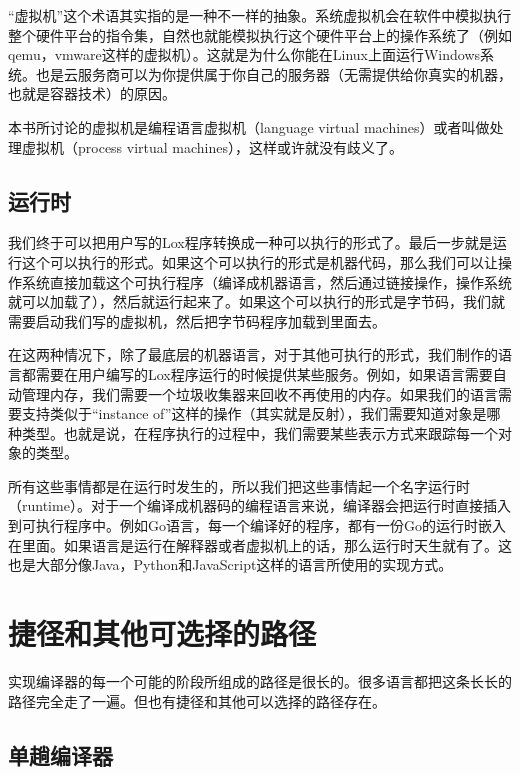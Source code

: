 \documentclass[cn,10pt,math=newtx,citestyle=gb7714-2015,bibstyle=gb7714-2015]{elegantbook}
\begin{document}
\begin{tcolorbox}
“虚拟机”这个术语其实指的是一种不一样的抽象。系统虚拟机会在软件中模拟执行整个硬件平台的指令集，自然也就能模拟执行这个硬件平台上的操作系统了（例如qemu，vmware这样的虚拟机）。这就是为什么你能在Linux上面运行Windows系统。也是云服务商可以为你提供属于你自己的服务器（无需提供给你真实的机器，也就是容器技术）的原因。

本书所讨论的虚拟机是编程语言虚拟机（language virtual machines）或者叫做处理虚拟机（process virtual machines），这样或许就没有歧义了。
\end{tcolorbox}

\subsection{运行时}

我们终于可以把用户写的Lox程序转换成一种可以执行的形式了。最后一步就是运行这个可以执行的形式。如果这个可以执行的形式是机器代码，那么我们可以让操作系统直接加载这个可执行程序（编译成机器语言，然后通过链接操作，操作系统就可以加载了），然后就运行起来了。如果这个可以执行的形式是字节码，我们就需要启动我们写的虚拟机，然后把字节码程序加载到里面去。

在这两种情况下，除了最底层的机器语言，对于其他可执行的形式，我们制作的语言都需要在用户编写的Lox程序运行的时候提供某些服务。例如，如果语言需要自动管理内存，我们需要一个垃圾收集器来回收不再使用的内存。如果我们的语言需要支持类似于“instance of”这样的操作（其实就是反射），我们需要知道对象是哪种类型。也就是说，在程序执行的过程中，我们需要某些表示方式来跟踪每一个对象的类型。

所有这些事情都是在运行时发生的，所以我们把这些事情起一个名字运行时（runtime）。对于一个编译成机器码的编程语言来说，编译器会把运行时直接插入到可执行程序中。例如Go语言，每一个编译好的程序，都有一份Go的运行时嵌入在里面。如果语言是运行在解释器或者虚拟机上的话，那么运行时天生就有了。这也是大部分像Java，Python和JavaScript这样的语言所使用的实现方式。

\section{捷径和其他可选择的路径}

实现编译器的每一个可能的阶段所组成的路径是很长的。很多语言都把这条长长的路径完全走了一遍。但也有捷径和其他可以选择的路径存在。

\subsection{单趟编译器}
\end{document}
